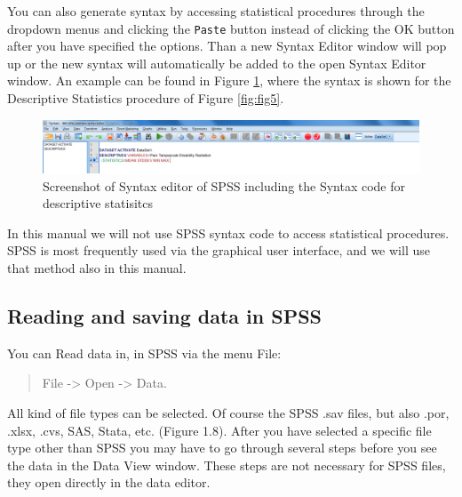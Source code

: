 \documentclass[]{book}
\theoremstyle{definition}
\theoremstyle{definition}
\theoremstyle{definition}
\theoremstyle{remark}
\begin{document}
You can also generate syntax by accessing statistical procedures through
the dropdown menus and clicking the \texttt{Paste} button instead of
clicking the OK button after you have specified the options. Than a new
Syntax Editor window will pop up or the new syntax will automatically be
added to the open Syntax Editor window. An example can be found in
Figure \ref{fig:fig7}, where the syntax is shown for the Descriptive
Statistics procedure of Figure \ref{fig:fig5}.

\begin{figure}

{\centering \includegraphics[width=0.8\linewidth]{images/fig1.7} 

}

\caption{Screenshot of Syntax editor of SPSS including the Syntax code for descriptive statisitcs}\label{fig:fig7}
\end{figure}

In this manual we will not use SPSS syntax code to access statistical
procedures. SPSS is most frequently used via the graphical user
interface, and we will use that method also in this manual.

\subsection{Reading and saving data in
SPSS}\label{reading-and-saving-data-in-spss}

You can Read data in, in SPSS via the menu File:

\begin{quote}
File -\textgreater{} Open -\textgreater{} Data.
\end{quote}

All kind of file types can be selected. Of course the SPSS .sav files,
but also .por, .xlsx, .cvs, SAS, Stata, etc. (Figure 1.8). After you
have selected a specific file type other than SPSS you may have to go
through several steps before you see the data in the Data View window.
These steps are not necessary for SPSS files, they open directly in the
data editor.
\end{document}
